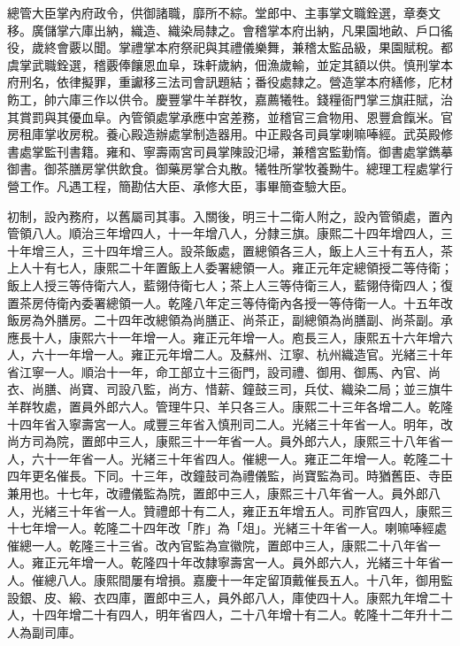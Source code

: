 \begin{pinyinscope}
總管大臣掌內府政令，供御諸職，靡所不綜。堂郎中、主事掌文職銓選，章奏文移。廣儲掌六庫出納，織造、織染局隸之。會稽掌本府出納，凡果園地畝、戶口徭役，歲終會覈以聞。掌禮掌本府祭祀與其禮儀樂舞，兼稽太監品級，果園賦稅。都虞掌武職銓選，稽覈俸饟恩血阜，珠軒歲納，佃漁歲輸，並定其額以供。慎刑掌本府刑名，依律擬罪，重讞移三法司會訊題結；番役處隸之。營造掌本府繕修，庀材飭工，帥六庫三作以供令。慶豐掌牛羊群牧，嘉薦犧牲。錢糧衙門掌三旗莊賦，治其賞罰與其優血阜。內管領處掌承應中宮差務，並稽官三倉物用、恩豐倉餼米。官房租庫掌收房稅。養心殿造辦處掌制造器用。中正殿各司員掌喇嘛唪經。武英殿修書處掌監刊書籍。雍和、寧壽兩宮司員掌陳設氾埽，兼稽宮監勤惰。御書處掌鐫摹御書。御茶膳房掌供飲食。御藥房掌合丸散。犧牲所掌牧養黝牛。總理工程處掌行營工作。凡遇工程，簡勘估大臣、承修大臣，事畢簡查驗大臣。

初制，設內務府，以舊屬司其事。入關後，明三十二衛人附之，設內管領處，置內管領八人。順治三年增四人，十一年增八人，分隸三旗。康熙二十四年增四人，三十年增三人，三十四年增三人。設茶飯處，置總領各三人，飯上人三十有五人，茶上人十有七人，康熙二十年置飯上人委署總領一人。雍正元年定總領授二等侍衛；飯上人授三等侍衛六人，藍翎侍衛七人；茶上人三等侍衛三人，藍翎侍衛四人；復置茶房侍衛內委署總領一人。乾隆八年定三等侍衛內各授一等侍衛一人。十五年改飯房為外膳房。二十四年改總領為尚膳正、尚茶正，副總領為尚膳副、尚茶副。承應長十人，康熙六十一年增一人。雍正元年增一人。庖長三人，康熙五十六年增六人，六十一年增一人。雍正元年增二人。及蘇州、江寧、杭州織造官。光緒三十年省江寧一人。順治十一年，命工部立十三衙門，設司禮、御用、御馬、內官、尚衣、尚膳、尚寶、司設八監，尚方、惜薪、鐘鼓三司，兵仗、織染二局；並三旗牛羊群牧處，置員外郎六人。管理牛只、羊只各三人。康熙二十三年各增二人。乾隆十四年省入寧壽宮一人。咸豐三年省入慎刑司二人。光緒三十年省一人。明年，改尚方司為院，置郎中三人，康熙三十一年省一人。員外郎六人，康熙三十八年省一人，六十一年省一人。光緒三十年省四人。催總一人。雍正二年增一人。乾隆二十四年更名催長。下同。十三年，改鐘鼓司為禮儀監，尚寶監為司。時猶舊臣、寺臣兼用也。十七年，改禮儀監為院，置郎中三人，康熙三十八年省一人。員外郎八人，光緒三十年省一人。贊禮郎十有二人，雍正五年增五人。司胙官四人，康熙三十七年增一人。乾隆二十四年改「胙」為「俎」。光緒三十年省一人。喇嘛唪經處催總一人。乾隆三十三省。改內官監為宣徽院，置郎中三人，康熙二十八年省一人。雍正元年增一人。乾隆四十年改隸寧壽宮一人。員外郎六人，光緒三十年省一人。催總八人。康熙間屢有增損。嘉慶十一年定留頂戴催長五人。十八年，御用監設銀、皮、緞、衣四庫，置郎中三人，員外郎八人，庫使四十人。康熙九年增二十人，十四年增二十有四人，明年省四人，二十八年增十有二人。乾隆十二年升十二人為副司庫。


\end{pinyinscope}
